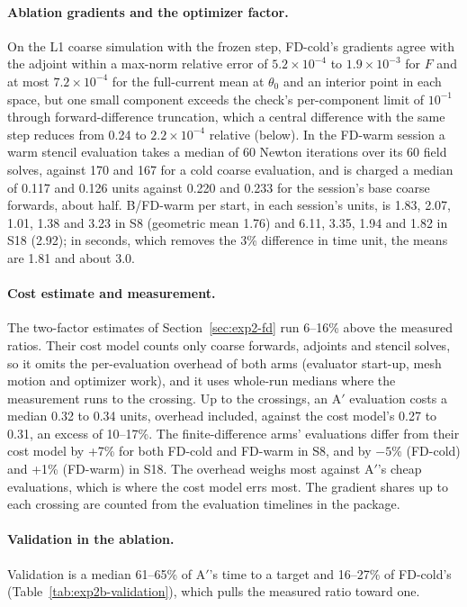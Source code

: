 \documentclass{anvil-paper}
\begin{document}
\paragraph{Ablation gradients and the optimizer factor.}
On the L1 coarse simulation with the frozen step, FD-cold's gradients agree with the
adjoint within a max-norm relative error of $5.2\times10^{-4}$ to
$1.9\times10^{-3}$ for $F$ and at most $7.2\times10^{-4}$ for the
full-current mean at $\theta_0$ and an interior point in each space, but
one small component exceeds the check's per-component limit of $10^{-1}$
through forward-difference truncation, which a central difference with the
same step reduces from 0.24 to $2.2\times10^{-4}$ relative
(below). In
the FD-warm session a warm stencil evaluation takes a median of 60 Newton iterations over its 60
field solves, against 170 and 167 for a cold coarse evaluation, and is
charged a median of 0.117 and
0.126 units against 0.220 and 0.233 for the session's base coarse forwards,
about half. B/FD-warm per start, in each session's units, is 1.83,
2.07, 1.01, 1.38 and 3.23 in S8 (geometric mean 1.76) and 6.11, 3.35,
1.94 and 1.82 in S18 (2.92); in seconds, which removes the 3\%
difference in time unit, the means are 1.81 and about 3.0.

\paragraph{Cost estimate and measurement.}
The two-factor estimates of Section~\ref{sec:exp2-fd} run 6--16\% above
the measured ratios. Their cost model counts only coarse forwards, adjoints and
stencil solves, so it omits the per-evaluation overhead of both arms
(evaluator start-up, mesh motion and optimizer work), and it uses
whole-run medians where the measurement runs to the crossing. Up to the
crossings, an A$'$ evaluation costs a median 0.32 to 0.34 units, overhead
included, against the cost model's 0.27 to 0.31, an excess of 10--17\%. The
finite-difference arms' evaluations differ from their cost model by +7\% for both
FD-cold and FD-warm in S8, and by $-5$\% (FD-cold) and +1\% (FD-warm) in S18. The overhead weighs most against A$'$'s cheap evaluations, which
is where the cost model errs most. The gradient shares up to
each crossing are counted from the evaluation timelines in the package.

\paragraph{Validation in the ablation.}
Validation is a median 61--65\% of A$'$'s time to
a target and 16--27\% of FD-cold's (Table~\ref{tab:exp2b-validation}), which
pulls the measured ratio toward one.
\end{document}
